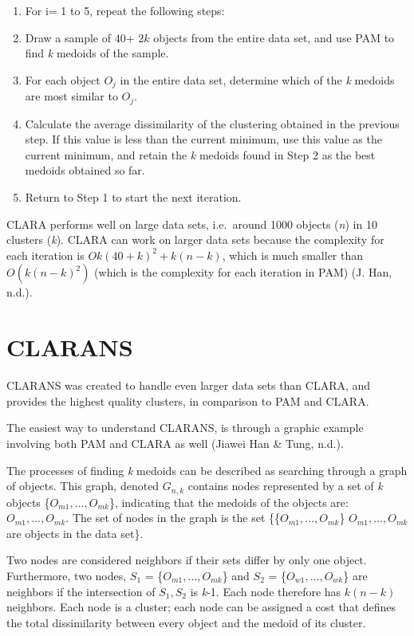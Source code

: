 \documentclass[12pt,twoside]{amherstthesis}
\begin{document}
  \begin{enumerate}
  \def\labelenumi{\arabic{enumi}.}
  \item
    For i= 1 to 5, repeat the following steps:
  \item
    Draw a sample of 40+ 2\(k\) objects from the entire data set, and use
    PAM to find \emph{k} medoids of the sample.
  \item
    For each object \(O_j\) in the entire data set, determine which of the
    \emph{k} medoids are most similar to \(O_j\).
  \item
    Calculate the average dissimilarity of the clustering obtained in the
    previous step. If this value is less than the current minimum, use
    this value as the current minimum, and retain the \emph{k} medoids
    found in Step 2 as the best medoids obtained so far.
  \item
    Return to Step 1 to start the next iteration.
  \end{enumerate}
  
  CLARA performs well on large data sets, i.e.~around 1000 objects
  (\emph{n}) in 10 clusters (\emph{k}). CLARA can work on larger data sets
  because the complexity for each iteration is
  \(O{k(40 + k)^2 + k(n-k)}\), which is much smaller than \(O(k(n-k)^2)\)
  (which is the complexity for each iteration in PAM) (J. Han, n.d.).
  
  \section{CLARANS}\label{clarans}
  
  CLARANS was created to handle even larger data sets than CLARA, and
  provides the highest quality clusters, in comparison to PAM and CLARA.
  
  The easiest way to understand CLARANS, is through a graphic example
  involving both PAM and CLARA as well (Jiawei Han \& Tung, n.d.).
  
  The processes of finding \emph{k} medoids can be described as searching
  through a graph of objects. This graph, denoted \(G_{n,k}\) contains
  nodes represented by a set of \emph{k} objects
  \{\(O_{m1},... , O_{mk}\)\}, indicating that the medoids of the objects
  are: \(O_{m1},... , O_{mk}\). The set of nodes in the graph is the set
  \{\{\(O_{m1},... , O_{mk}\)\} \textbar{} \(O_{m1},... , O_{mk}\) are
  objects in the data set\}.
  
  Two nodes are considered neighbors if their sets differ by only one
  object. Furthermore, two nodes, \(S_1\) = \{\(O_{m1},... , O_{mk}\)\}
  and \(S_2\) = \{\(O_{w1},... , O_{wk}\)\} are neighbors if the
  intersection of \(S_1, S_2\) is \emph{k}-1. Each node therefore has
  \(k(n-k)\) neighbors. Each node is a cluster; each node can be assigned
  a cost that defines the total dissimilarity between every object and the
  medoid of its cluster.
  
\end{document}
